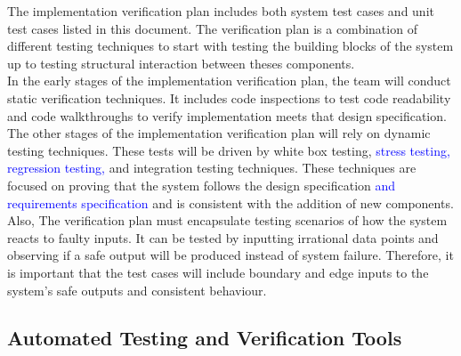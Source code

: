 \documentclass[12pt, titlepage]{article}
\begin{document}
The implementation verification plan includes both
system test cases and unit test cases listed in this 
document. The verification plan is a combination of 
different testing techniques to start with testing the 
building blocks of the system up to testing structural 
interaction between theses components.\\ 
In the early stages of the implementation verification 
plan, the team will conduct static verification
techniques. It includes code inspections to test code 
readability and code walkthroughs to verify 
implementation meets that design specification. \\
The other stages of the implementation verification plan will rely on dynamic 
testing techniques. These tests will be driven by white box testing, \textcolor{blue}{stress testing, regression testing,} and 
integration testing techniques. These techniques are focused on proving that 
the system follows the design specification \textcolor{blue}{and requirements specification} and is consistent with the addition of
new components. Also, The verification plan must encapsulate testing scenarios of how the system reacts to faulty inputs. It can be tested by inputting irrational data points and observing if a safe output will be produced instead of system failure. Therefore, it is important that the test cases will include boundary and edge inputs to the system's safe outputs and consistent behaviour.



\subsection{Automated Testing and Verification Tools}

\end{document}
